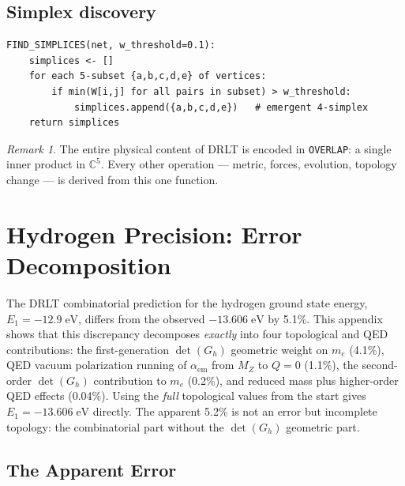 \documentclass[12pt]{article}
\theoremstyle{remark}
\newtheorem{remark}[theorem]{Remark}
\theoremstyle{definition}
\begin{document}
\subsection{Simplex discovery}

\begin{verbatim}
FIND_SIMPLICES(net, w_threshold=0.1):
    simplices <- []
    for each 5-subset {a,b,c,d,e} of vertices:
        if min(W[i,j] for all pairs in subset) > w_threshold:
            simplices.append({a,b,c,d,e})   # emergent 4-simplex
    return simplices
\end{verbatim}

\begin{remark}
The entire physical content of DRLT is encoded in \texttt{OVERLAP}: a single inner product in $\mathbb{C}^5$. Every other operation --- metric, forces, evolution, topology change --- is derived from this one function.
\end{remark}


\section{Hydrogen Precision: Error Decomposition}\label{app:hydrogen}

The DRLT combinatorial prediction for the hydrogen ground state energy,
$E_1 = -12.9\;\text{eV}$, differs from the observed $-13.606\;\text{eV}$
by 5.1\%.  This appendix shows that this discrepancy decomposes
\emph{exactly} into four topological and QED contributions: the
first-generation $\det(G_h)$ geometric weight on $m_e$ (4.1\%), QED
vacuum polarization running of $\alpha_\text{em}$ from $M_Z$ to $Q=0$
(1.1\%), the second-order $\det(G_h)$ contribution to $m_e$ (0.2\%), and
reduced mass plus higher-order QED effects (0.04\%).  Using the
\emph{full} topological values from the start gives $E_1=-13.606\;\text{eV}$
directly.  The apparent 5.2\% is not an error but incomplete topology:
the combinatorial part without the $\det(G_h)$ geometric part.

\subsection{The Apparent Error}
\end{document}
